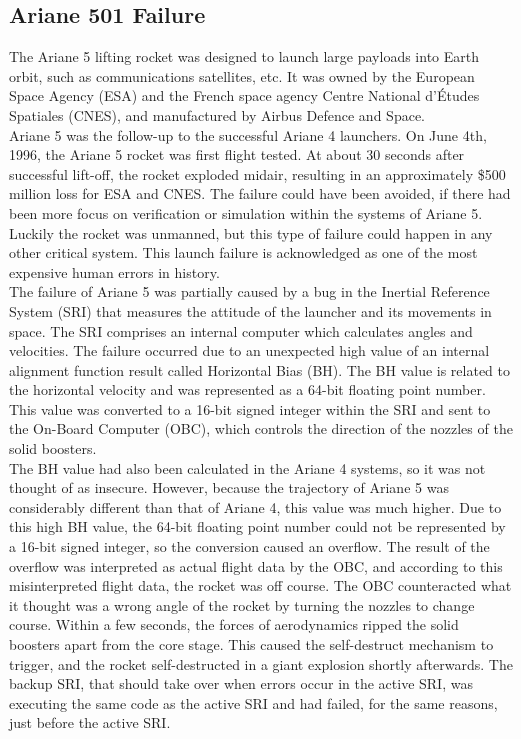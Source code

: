 \subsection{Ariane 501 Failure}
The Ariane 5 lifting rocket\cite{InquiryBoard1996} was designed to launch large payloads into Earth orbit, such as communications satellites, etc. It was owned by the European Space Agency (ESA) and the French space agency Centre National d'\'Etudes Spatiales (CNES), and manufactured by Airbus Defence and Space.\\

Ariane 5 was the follow-up to the successful Ariane 4 launchers. On June 4th, 1996, the Ariane 5 rocket was first flight tested. At about 30 seconds after successful lift-off, the rocket exploded midair, resulting in an approximately \$500 million loss for ESA and CNES. The failure could have been avoided, if there had been more focus on verification or simulation within the systems of Ariane 5. Luckily the rocket was unmanned, but this type of failure could happen in any other critical system. This launch failure is acknowledged as one of the most expensive human errors in history. \\

The failure of Ariane 5 was partially caused by a bug in the Inertial Reference System (SRI) that measures the attitude of the launcher and its movements in space. The SRI comprises an internal computer which calculates angles and velocities.
The failure occurred due to an unexpected high value of an internal alignment function result called Horizontal Bias (BH). The BH value is related to the horizontal velocity and was represented as a 64-bit floating point number. This value was converted to a 16-bit signed integer within the SRI and sent to the On-Board Computer (OBC), which controls the direction of the nozzles of the solid boosters.\\

The BH value had also been calculated in the Ariane 4 systems, so it was not thought of as insecure. However, because the trajectory of Ariane 5 was considerably different than that of Ariane 4, this value was much higher. Due to this high BH value, the 64-bit floating point number could not be represented by a 16-bit signed integer, so the conversion caused an overflow.
The result of the overflow was interpreted as actual flight data by the OBC, and according to this misinterpreted flight data, the rocket was off course. The OBC counteracted what it thought was a wrong angle of the rocket by turning the nozzles to change course. Within a few seconds, the forces of aerodynamics ripped the solid boosters apart from the core stage. This caused the self-destruct mechanism to trigger, and the rocket self-destructed in a giant explosion shortly afterwards. The backup SRI, that should take over when errors occur in the active SRI, was executing the same code as the active SRI and had failed, for the same reasons, just before the active SRI.\\

